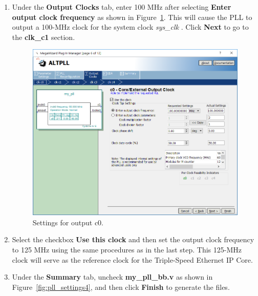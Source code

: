 \documentclass[11pt, twoside, pdftex]{article}
\begin{document}
\begin{enumerate}
	\item Under the {\bf Output Clocks} tab, enter 100 MHz after selecting {\bf Enter output clock frequency} as shown in Figure~\ref{fig:pll_settings3}. This will cause the PLL to output a 100-MHz clock for the system clock {\it sys\_clk} . Click {\bf Next} to go to the {\bf clk\_c1} section.
	
	\begin{figure}[H]
		\centering
		  \includegraphics[scale=0.5]{figures/pll_settings3.png}
		\caption{Settings for output c0.} 
		\label{fig:pll_settings3}
	\end{figure}
	
	\item Select the checkbox {\bf Use this clock} and then set the output clock frequency to 125 MHz using the same procedures as in the last step. This 125-MHz clock will serve as the reference clock for the Triple-Speed Ethernet IP Core.

	\item Under the {\bf Summary} tab, uncheck {\bf my\_pll\_bb.v} as shown in Figure~\ref{fig:pll_settings4}, and then click {\bf Finish} to generate the files.	
	

\end{enumerate}
\end{document}
